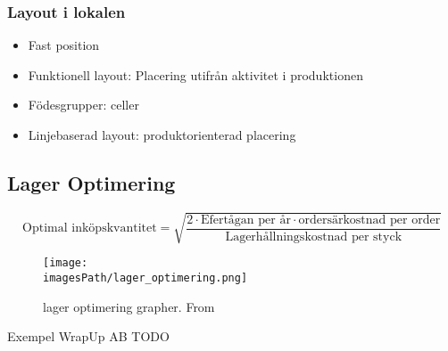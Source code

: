\subsubsection{Layout i lokalen}
\begin{itemize}
    \item Fast position 
    \item Funktionell layout: Placering utifrån aktivitet i produktionen
    \item Födesgrupper: celler 
    \item Linjebaserad layout: produktorienterad placering
\end{itemize}

\subsection{Lager Optimering}
\begin{equation*}
    \text{Optimal inköpskvantitet} 
    = \sqrt{\frac{ 2\cdot\text{Efertågan per år}\cdot\text{ordersärkostnad per order} }{ \text{Lagerhållningskostnad per styck} }}
\end{equation*}

\begin{figure}[!ht]
    \centering
    \texttt{[image: \\imagesPath/lager\_optimering.png]}
    \caption{lager optimering grapher. From \cite{}}
\end{figure}

\begin{exampleblock}{Exempel WrapUp AB}
   TODO 
\end{exampleblock}

